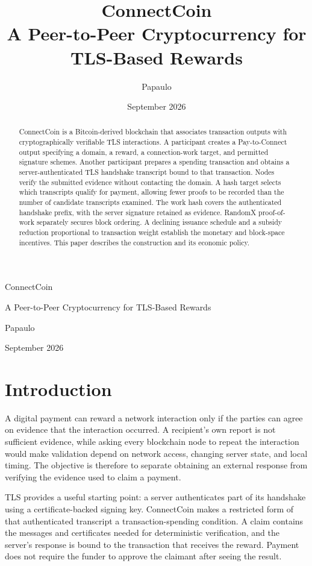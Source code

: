 \documentclass[11pt,a4paper]{article}
\title{ConnectCoin\\[3pt]\large A Peer-to-Peer Cryptocurrency for TLS-Based Rewards}
\author{Papaulo}
\date{September 2026}
\begin{document}
\begin{center}
{\LARGE ConnectCoin\par}
\vspace{5pt}
{\large A Peer-to-Peer Cryptocurrency for TLS-Based Rewards\par}
\vspace{8pt}
Papaulo\par
\vspace{8pt}
September 2026
\end{center}
\vspace{6pt}

\begin{abstract}
ConnectCoin is a Bitcoin-derived blockchain that associates transaction outputs
with cryptographically verifiable TLS interactions. A participant creates a
Pay-to-Connect output specifying a domain, a reward, a connection-work
target, and permitted signature schemes. Another participant prepares a spending transaction and obtains a
server-authenticated TLS handshake transcript bound to that transaction. Nodes
verify the submitted evidence without contacting the domain. A hash target
selects which transcripts qualify for payment, allowing fewer proofs to be
recorded than the number of candidate transcripts examined. The work hash
covers the authenticated handshake prefix, with the server signature retained
as evidence. RandomX proof-of-work separately secures block
ordering. A declining issuance schedule and a subsidy reduction proportional
to transaction weight establish the monetary and block-space incentives.
This paper describes the construction and its economic policy.
\end{abstract}

\section{Introduction}

A digital payment can reward a network interaction only if the parties can agree
on evidence that the interaction occurred. A recipient's own report is not
sufficient evidence, while asking every blockchain node to repeat the interaction
would make validation depend on network access, changing server state, and local
timing. The objective is therefore to separate obtaining an external response
from verifying the evidence used to claim a payment.

TLS provides a useful starting point: a server authenticates part of its
handshake using a certificate-backed signing key. ConnectCoin makes a restricted
form of that authenticated transcript a transaction-spending condition. A claim
contains the messages and certificates needed for deterministic verification,
and the server's response is bound to the transaction that receives the reward.
Payment does not require the funder to approve the claimant after seeing the
result.
\end{document}
